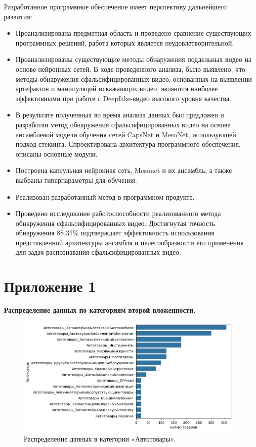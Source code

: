 \documentclass[a4paper,12pt]{extarticle}
\begin{document}
Разработанное программное обеспечение имеет перспективу дальнейшего развития:
\begin{itemize}
	\item Проанализирована предметная область и проведено сравнение существующих программных решений, работа которых является неудовлетворительной.
	\item Проанализированы существующие методы обнаружения поддельных видео на основе нейронных сетей. В ходе проведенного анализа, было выявлено, что методы обнаружения сфальсифицированных видео, основанных на выявлении артефактов и манипуляций искажающих видео, являются наиболее эффективными при работе с Deepfake-видео высокого уровня качества.
	\item В результате полученных во время анализа данных был предложен и разработан метод обнаружения сфальсифицированных видео на основе ансамблевой модели обучения сетей CapsNet и MesoNet, используюшей подход стекинга. Спроектирована архитектура программного обеспечения, описаны основные модули.
	\item Построена капсульная нейронная сеть, Mesonet и их ансамбль, а также выбраны гиперпараметры для обучения.
	\item Реализован разработанный метод в программном продукте.
	\item Проведено исследование работоспособности реализованного метода обнаружения сфальсифицированных видео. Достигнутая точность обнаружения 88.35\% подтверждает эффективность использования представленной архитектуры ансамбля и целесообразности его применения для задач распознавания сфальсифицированных видео.
\end{itemize}

\newpage
\nocite{*}
\printbibliography[heading=bibintoc]

\newpage
\appendix

\section{Приложение 1}
\label{appendix:amount_of_categor2}
\textbf{\large{Распределение данных по категориям второй вложенности.}}

\begin{figure}[hbtp]
	\centering
	\includegraphics[scale=0.8]{приложения/amount_of_category_Автотовары.png}
	\caption{Распределение данных в категории «Автотовары».}
	\label{fig:amount_of_category_Автотовары}
\end{figure}
\end{document}
